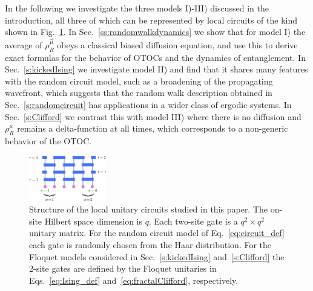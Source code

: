 \documentclass[aps,prb,twocolumn,superscriptaddress]{revtex4-1}
\begin{document}
In the following we investigate the three models I)-III) discussed in the introduction, all three of which can be represented by local circuits of the kind shown in Fig.~\ref{fig:circuit}. In Sec.~\ref{ss:randomwalkdynamics} we show that for model I) the average of $\rho^{\vec{\mu}}_R$ obeys a classical biased diffusion equation, and use this to derive exact formulas for the behavior of OTOCs and the dynamics of entanglement. In Sec.~\ref{s:kickedIsing} we investigate model II) and find that it shares many features with the random circuit model, such as a broadening of the propagating wavefront, which suggests that the random walk description obtained in Sec.~\ref{s:randomcircuit} has applications in a wider class of ergodic systems. In Sec.~\ref{s:Clifford} we contrast this with model III) where there is no diffusion and $\rho_R^\mu$ remains a delta-function at all times, which corresponds to a non-generic behavior of the OTOC.

 \begin{figure}[h!]
 \centering
  	\includegraphics[width=0.3\textwidth]{random_circuit.pdf} 
\caption{Structure of the local unitary circuits studied in this paper. The on-site Hilbert space dimension is $q$. Each two-site gate is a $q^2 \times q^2$ unitary matrix. For the random circuit model of Eq.~\eqref{eq:circuit_def} each gate is randomly chosen from the Haar distribution. For the Floquet models considered in Sec.~\ref{s:kickedIsing} and~\ref{s:Clifford} the 2-site gates are defined by the Floquet unitaries in Eqs.~\eqref{eq:Ising_def} and~\eqref{eq:fractalClifford}, respectively.}
 \label{fig:circuit}
 \end{figure}
\end{document}

